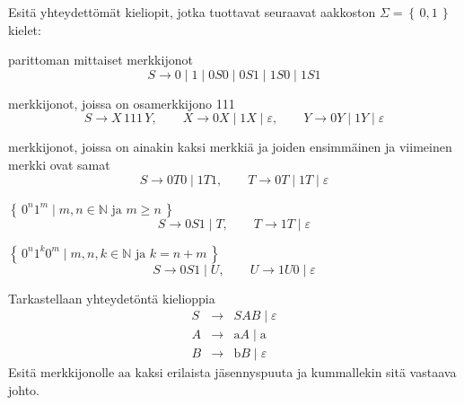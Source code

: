 \documentclass[12pt,a4paper]{article}
\newcommand{\set}[1]{\left\{\,#1\,\right\}}
\newcommand{\N}{\mathbb{N}}
\begin{document}
\pagebreak
{}
Esitä yhteydettömät kieliopit, jotka tuottavat seuraavat
aakkoston $\Sigma=\set{0,1}$ kielet:
\begin{kohta}
\item
parittoman mittaiset merkkijonot
\[
S \to 0 \mid 1 \mid 0S0 \mid 0S1 \mid 1S0 \mid 1S1
\]

\item merkkijonot, joissa on osamerkkijono 111
\[
S \to X\,111\,Y,\qquad
X \to 0X \mid 1X \mid \varepsilon,\qquad
Y \to 0Y \mid 1Y \mid \varepsilon
\]
\item
merkkijonot, joissa on ainakin kaksi merkkiä ja joiden
ensimmäinen ja viimeinen merkki ovat samat
\[
S \to 0T0 \mid 1T1,\qquad
T \to 0T \mid 1T \mid \varepsilon
\]

\item $\set{0^n1^m\mid\mbox{$m,n\in\N$ ja $m\geq n$}}$
\[
S \to 0S1 \mid T,\qquad
T \to 1T \mid \varepsilon
\]

\item $\set{0^n1^k0^m\mid\mbox{$m,n,k\in\N$ ja $k=n+m$}}$
\[
S \to 0S1 \mid U,\qquad
U \to 1U0 \mid \varepsilon
\]

\end{kohta}






\pagebreak
{}
  
Tarkastellaan yhteydetöntä kielioppia
\begin{eqnarray*}
S&\rightarrow& SAB\mid\varepsilon\\
A&\rightarrow& \mathrm{a}A\mid\mathrm{a}\\
B&\rightarrow& \mathrm{b}B\mid\varepsilon
\end{eqnarray*}
Esitä merkkijonolle $\mathrm{aa}$ kaksi erilaista
jäsennyspuuta ja kummallekin sitä vastaava johto.

\bigskip
\end{document}
